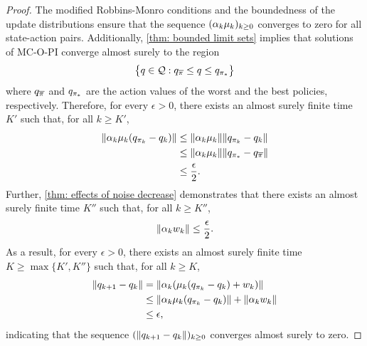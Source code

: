 \begin{proof}
    The modified Robbins-Monro conditions and the boundedness of the update distributions ensure that the sequence $(\alpha_k \mu_k)_{k \ge 0}$ converges to zero for all state-action pairs.
    Additionally, \autoref{thm: bounded limit sets} implies that solutions of MC-O-PI converge almost surely to the region
    \begin{align}
        \big\{q \in \mathcal{Q} : q_{\overline{\pi}} \le q \le q_{{\pi}_*} \big\}
    \end{align}
    where $q_{\overline{\pi}}$ and $q_{{\pi}_*}$ are the action values of the worst and the best policies, respectively.
    Therefore, for every $\epsilon > 0$, there exists an almost surely finite time $K'$ such that, for all $k \geq K'$,
    \begin{align*}
     \|\alpha_k \mu_k (q_{\pi_k} - q_k)\| 
     &\leq \|\alpha_k \mu_k \| \|q_{\pi_k} - q_k\| 
     \\
     &\leq \|\alpha_k \mu_k \| \|q_{{\pi}_*} - q_{\overline{\pi}}\|
     \\
     &\leq \frac{\epsilon}{2} .
    \end{align*}
    Further, \autoref{thm: effects of noise decrease} demonstrates that there exists an almost surely finite time $K''$ such that, for all $k \geq K''$,
    \begin{align*}
     \|\alpha_k w_k \| \leq \frac{\epsilon}{2} .
    \end{align*}
    As a result, for every $\epsilon > 0$,
    there exists an almost surely finite time $K \geq \max\{K', K''\}$ such that, for all $k \geq K$,
    \begin{align*}
        \| q_{{k+1}} - q_k \| 
        &= \| \alpha_k ( \mu_k (q_{\pi_k} - q_k ) + w_k) \|
        \\
        &\leq \| \alpha_k \mu_k (q_{\pi_k} - q_k) \| + \| \alpha_k w_k \|
        \\
        &\leq \epsilon ,
    \end{align*}
    indicating that the sequence $(\|q_{{k+1}} - q_k\|)_{k \ge 0}$ converges almost surely to zero.
\end{proof}